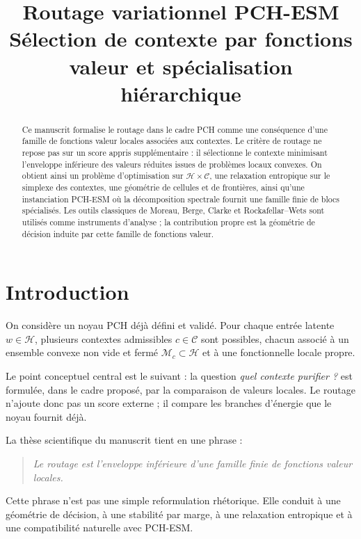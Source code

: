 \documentclass[11pt,a4paper]{article}
\title{Routage variationnel PCH-ESM\\
\large Sélection de contexte par fonctions valeur et spécialisation hiérarchique}
\author{}
\date{}
\newcommand{\Hh}{\mathcal H}
\newcommand{\Mcal}{\mathcal M}
\newcommand{\Ccal}{\mathcal C}
\begin{document}
\maketitle

\begin{abstract}
Ce manuscrit formalise le routage dans le cadre PCH comme une conséquence d'une famille de fonctions valeur locales associées aux contextes. Le critère de routage ne repose pas sur un score appris supplémentaire : il sélectionne le contexte minimisant l'enveloppe inférieure des valeurs réduites issues de problèmes locaux convexes. On obtient ainsi un problème d'optimisation sur \(\Hh\times\Ccal\), une relaxation entropique sur le simplexe des contextes, une géométrie de cellules et de frontières, ainsi qu'une instanciation PCH-ESM où la décomposition spectrale fournit une famille finie de blocs spécialisés. Les outils classiques de Moreau, Berge, Clarke et Rockafellar--Wets sont utilisés comme instruments d'analyse ; la contribution propre est la géométrie de décision induite par cette famille de fonctions valeur.
\end{abstract}

\tableofcontents

\section{Introduction}

On considère un noyau PCH déjà défini et validé. Pour chaque entrée latente \(w\in\Hh\), plusieurs contextes admissibles \(c\in\Ccal\) sont possibles, chacun associé à un ensemble convexe non vide et fermé \(\Mcal_c\subset\Hh\) et à une fonctionnelle locale propre.

Le point conceptuel central est le suivant : la question \emph{quel contexte purifier ?} est formulée, dans le cadre proposé, par la comparaison de valeurs locales. Le routage n'ajoute donc pas un score externe ; il compare les branches d'énergie que le noyau fournit déjà.

La thèse scientifique du manuscrit tient en une phrase :
\begin{quote}
\emph{Le routage est l'enveloppe inférieure d'une famille finie de fonctions valeur locales.}
\end{quote}
Cette phrase n'est pas une simple reformulation rhétorique. Elle conduit à une géométrie de décision, à une stabilité par marge, à une relaxation entropique et à une compatibilité naturelle avec PCH-ESM.
\end{document}
